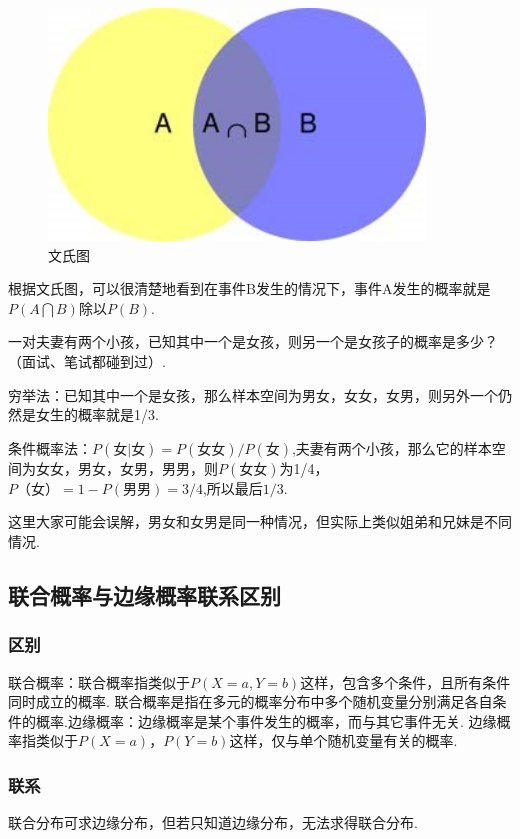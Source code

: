 \begin{figure}
  \centering
  \includegraphics[width=10cm,heigth=7cm]{./img/ch1/conditional_probability.jpg}  
  \caption{文氏图}
  \label{fig:0101}
\end{figure}
根据文氏图，可以很清楚地看到在事件B发生的情况下，事件A发生的概率就是\(P(A\bigcap B)\)除以\(P(B)\).
\begin{example}
  一对夫妻有两个小孩，已知其中一个是女孩，则另一个是女孩子的概率是多少？（面试、笔试都碰到过）.
\end{example}
\begin{solve*}
   {穷举法}：已知其中一个是女孩，那么样本空间为男女，女女，女男，则另外一个仍然是女生的概率就是1/3.
  
     {条件概率法}：\(P(女|女)=P(女女)/P(女)\),夫妻有两个小孩，那么它的样本空间为女女，男女，女男，男男，则\(P(女女)\)为1/4，\(P（女）= 1-P(男男)=3/4\),所以最后\(1/3\).

    这里大家可能会误解，男女和女男是同一种情况，但实际上类似姐弟和兄妹是不同情况.    
\end{solve*}

\subsection{联合概率与边缘概率联系区别}
\label{ux8054ux5408ux6982ux7387ux4e0eux8fb9ux7f18ux6982ux7387ux8054ux7cfbux533aux522b}

\subsubsection{区别}
\label{sec:4.7.1}
​联合概率：联合概率指类似于\(P(X=a,Y=b)\)这样，包含多个条件，且所有条件同时成立的概率.
联合概率是指在多元的概率分布中多个随机变量分别满足各自条件的概率.
​边缘概率：边缘概率是某个事件发生的概率，而与其它事件无关.
边缘概率指类似于\(P(X=a)\)，\(P(Y=b)\)这样，仅与单个随机变量有关的概率.

\subsubsection{联系}
\label{sec:4.7.2}
​联合分布可求边缘分布，但若只知道边缘分布，无法求得联合分布.

